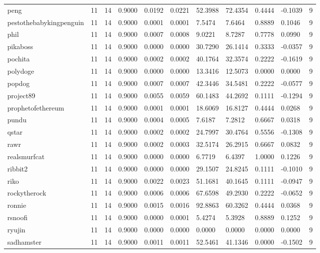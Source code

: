 \begin{table}[htbp]
\begin{tabular}{lllllllllll}
peng & 11 & 14 & 0.9000 & 0.0192 & 0.0221 & 52.3988 & 72.4354 & 0.4444 & -0.1039 & 9 \\
pestothebabykingpenguin & 11 & 14 & 0.9000 & 0.0001 & 0.0001 & 7.5474 & 7.6464 & 0.8889 & 0.1046 & 9 \\
phil & 11 & 14 & 0.9000 & 0.0007 & 0.0008 & 9.0221 & 8.7287 & 0.7778 & 0.0990 & 9 \\
pikaboss & 11 & 14 & 0.9000 & 0.0000 & 0.0000 & 30.7290 & 26.1414 & 0.3333 & -0.0357 & 9 \\
pochita & 11 & 14 & 0.9000 & 0.0002 & 0.0002 & 40.1764 & 32.3574 & 0.2222 & -0.1619 & 9 \\
polydoge & 11 & 14 & 0.9000 & 0.0000 & 0.0000 & 13.3416 & 12.5073 & 0.0000 & 0.0000 & 9 \\
popdog & 11 & 14 & 0.9000 & 0.0007 & 0.0007 & 42.3446 & 34.5481 & 0.2222 & -0.0577 & 9 \\
project89 & 11 & 14 & 0.9000 & 0.0055 & 0.0059 & 60.1483 & 44.2692 & 0.1111 & -0.1294 & 9 \\
prophetofethereum & 11 & 14 & 0.9000 & 0.0001 & 0.0001 & 18.6069 & 16.8127 & 0.4444 & 0.0268 & 9 \\
pundu & 11 & 14 & 0.9000 & 0.0004 & 0.0005 & 7.6187 & 7.2812 & 0.6667 & 0.0318 & 9 \\
qstar & 11 & 14 & 0.9000 & 0.0002 & 0.0002 & 24.7997 & 30.4764 & 0.5556 & -0.1308 & 9 \\
rawr & 11 & 14 & 0.9000 & 0.0002 & 0.0003 & 32.5174 & 26.2915 & 0.6667 & 0.0832 & 9 \\
realsmurfcat & 11 & 14 & 0.9000 & 0.0000 & 0.0000 & 6.7719 & 6.4397 & 1.0000 & 0.1226 & 9 \\
ribbit2 & 11 & 14 & 0.9000 & 0.0000 & 0.0000 & 29.1507 & 24.8245 & 0.1111 & -0.1010 & 9 \\
riko & 11 & 14 & 0.9000 & 0.0022 & 0.0023 & 51.1681 & 40.1645 & 0.1111 & -0.0947 & 9 \\
rockytherock & 11 & 14 & 0.9000 & 0.0006 & 0.0006 & 67.6598 & 49.2930 & 0.2222 & -0.0652 & 9 \\
ronnie & 11 & 14 & 0.9000 & 0.0015 & 0.0016 & 92.8863 & 60.3262 & 0.4444 & 0.0368 & 9 \\
rsnoofi & 11 & 14 & 0.9000 & 0.0000 & 0.0001 & 5.4274 & 5.3928 & 0.8889 & 0.1252 & 9 \\
ryujin & 11 & 14 & 0.9000 & 0.0000 & 0.0000 & 0.0000 & 0.0000 & 0.0000 & 0.0000 & 9 \\
sadhamster & 11 & 14 & 0.9000 & 0.0011 & 0.0011 & 52.5461 & 41.1346 & 0.0000 & -0.1502 & 9 \\

\end{tabular}
\end{table}
